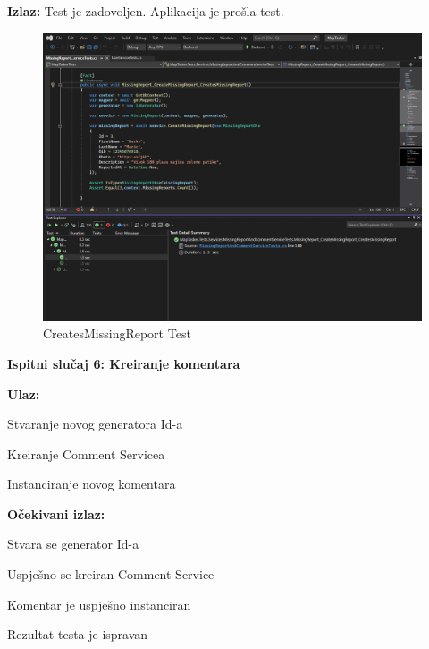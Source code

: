 			\noindent \textbf{Izlaz:} Test je zadovoljen. Aplikacija je prošla test.
			
			\begin{figure}[H] \includegraphics[width=\linewidth]{./slike/Testovi/Unit/UnitTest_5.png}
				\caption{CreatesMissingReport Test}
			\end{figure}
			
			\eject
			
			\noindent \textbf{Ispitni slučaj 6: Kreiranje komentara}
			
			\noindent \textbf{Ulaz:}
			
			\begin{packed_enum}
				
				\item Stvaranje novog generatora Id-a
				\item Kreiranje Comment Servicea
				\item Instanciranje novog komentara
				
			\end{packed_enum}
			
			\noindent \textbf{Očekivani izlaz:}
			
			\begin{packed_enum}
				
				\item Stvara se generator Id-a
				\item Uspješno se kreiran Comment Service
				\item Komentar je uspješno instanciran
				\item Rezultat testa je ispravan
				
			\end{packed_enum}
			
